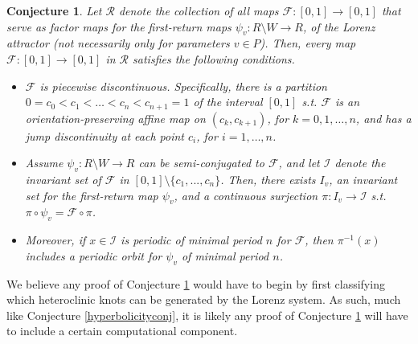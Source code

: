 \documentclass[10pt,reqno]{amsart}
\theoremstyle{plain}
\theoremstyle{assumption}
\theoremstyle{notation}
\theoremstyle{claim}
\theoremstyle{conj}
\theoremstyle{theorem}
\newtheorem{conjecture}{Conjecture}[section]
\theoremstyle{proposition}
\theoremstyle{corollary}
\begin{document}
\begin{conjecture}
    \label{onedim1} Let $\mathcal{R}$ denote the collection of all maps $\mathcal{F}:[0,1]\to[0,1]$ that serve as factor maps for the first-return maps $\psi_v:R\setminus W\to R$, of the Lorenz attractor (not necessarily only for parameters $v\in P$). Then, every map $\mathcal{F}:[0,1]\to[0,1]$ in $\mathcal{R}$ satisfies the following conditions.
    \begin{itemize}
        \item $\mathcal{F}$ is piecewise discontinuous. Specifically, there is a partition $0=c_0<c_1<\ldots<c_n<c_{n+1}=1$ of the interval $[0,1]$ s.t. $\mathcal{F}$ is an orientation-preserving affine map on $(c_k,c_{k+1})$, for $k=0,1,\ldots,n$, and has a jump discontinuity at each point $c_i$, for $i=1,\ldots,n$.
        \item Assume $\psi_v:R\setminus W\to R$ can be semi-conjugated to $\mathcal{F}$, and let $\mathcal{I}$ denote the invariant set of $\mathcal{F}$ in $[0,1]\setminus\{c_1,...,c_n\}$. Then, there exists $I_v$, an invariant set for the first-return map $\psi_v$, and a continuous surjection $\pi:I_v\to \mathcal{I}$ s.t. $\pi\circ\psi_v=\mathcal{F}\circ\pi$. 
        \item Moreover, if $x\in \mathcal{I}$ is periodic of minimal period $n$ for $\mathcal{F}$, then $\pi^{-1}(x)$ includes a periodic orbit for $\psi_v$ of minimal period $n$.
    \end{itemize}
\end{conjecture}

We believe any proof of Conjecture \ref{onedim1} would have to begin by first classifying which heteroclinic knots can be generated by the Lorenz system. As such, much like Conjecture \ref{hyperbolicityconj}, it is likely any proof of Conjecture \ref{onedim1} will have to include a certain computational component.
\end{document}
